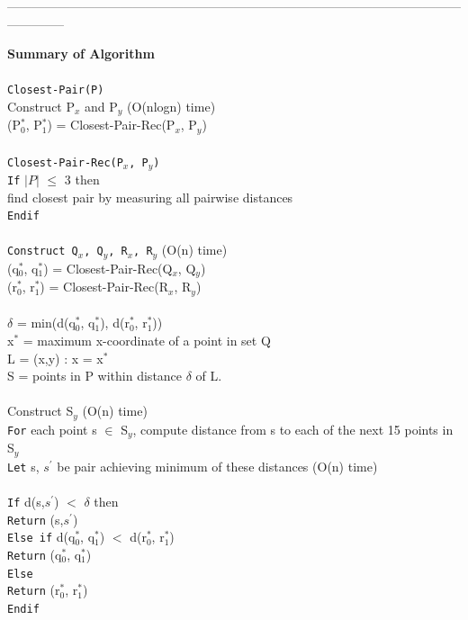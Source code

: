 \documentclass{article}
\begin{document}
--------------------------------------------------------------------------------------------------------------------------
\medskip

\textbf{Summary of Algorithm}\\ 
\\
\texttt{Closest-Pair(P)}\\
Construct P$_x$ and P$_y$ (O(nlogn) time)\\
(P$^*_0$, P$^*_1$) = Closest-Pair-Rec(P$_x$, P$_y$)\\
\\
\texttt{Closest-Pair-Rec(P$_x$, P$_y$)}\\
\texttt{If} $|P|$ $\le$ 3 then\\
find closest pair by measuring all pairwise distances\\
\texttt{Endif}\\
\\
\texttt{Construct Q$_x$, Q$_y$, R$_x$, R$_y$} (O(n) time)\\
(q$^*_0$, q$^*_1$) = Closest-Pair-Rec(Q$_x$, Q$_y$)\\
(r$^*_0$, r$^*_1$) = Closest-Pair-Rec(R$_x$, R$_y$)\\
\\
$\delta$ = min(d(q$^*_0$, q$^*_1$), d(r$^*_0$, r$^*_1$))\\
x$^*$ = maximum x-coordinate of a point in set Q\\
L = {(x,y) : x = x$^*$}\\
S = points in P within distance $\delta$ of L.\\
\\
Construct S$_y$ (O(n) time)\\
\texttt{For} each point s $\in$ S$_y$, compute distance from s to each of the next 15 points in S$_y$\\
\texttt{Let} s, $s^\prime$ be pair achieving minimum of these distances (O(n) time)\\
\\
\texttt{If} d(s,$s^\prime$) $<$ $\delta$ then\\
\texttt{Return} (s,$s^\prime$)\\
\texttt{Else if} d(q$^*_0$, q$^*_1$) $<$ d(r$^*_0$, r$^*_1$)\\
\texttt{Return} (q$^*_0$, q$^*_1$)\\
\texttt{Else}\\
\texttt{Return} (r$^*_0$, r$^*_1$)\\
\texttt{Endif}

\medskip
\end{document}
